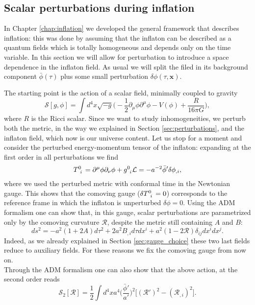 \subsection{Scalar perturbations during inflation}
In Chapter \ref{chap:inflation} we developed the general framework that describes inflation: this was done by assuming that the inflaton can be described as a quantum fields which is totally homogeneous and depends only on the time variable. In this section we will allow for perturbation to introduce a space dependence in the inflaton field. As usual we will split the filed in its background component $\bar\phi(\tau)$ plus some small perturbation $\delta\phi(\tau,\mathbf x)$.

The starting point is the action of a scalar field, minimally coupled to gravity
$$\mathcal{S} [g,\phi]=\int d^4x\sqrt{-g}\bigg(-\frac{1}{2}\partial_\mu\phi\partial^\mu\phi-V(\phi)+\frac{R}{16\pi G}\bigg),$$where $R$ is the Ricci scalar. Since we want to study inhomogeneities, we perturb both the metric, in the way we explained in Section \ref{sec:perturbations}, and the inflaton field, which now is our universe content. Let us stop for a moment and consider the perturbed energy-momentum tensor of the inflaton: expanding at the first order in all perturbations we find
\begin{align*}
    \tensor{T}{^0_i}=\partial^\mu\phi\partial_\nu\phi+\tensor{g}{^0_i}\mathcal{L}=-a^{-2}\bar\phi'\delta\phi_{,i},
\end{align*}
where we used the perturbed metric with conformal time in the Newtonian gauge. This shows that the comoving gauge ($\delta\tensor{T}{^0_i}=0$) corresponds to the reference frame in which the inflaton is unperturbed $\delta\phi=0$.
Using the ADM formalism one can show that, in this gauge, scalar perturbations are parametrized only by the comoving curvature $\mathcal{R}$, despite the metric still containing $A$ and $B$:
$$ds^2=-a^2(1+2A)d\tau^2+2a^2B_{,i}d\tau dx^i+a^2(1-2\mathcal{R})\delta_{ij}dx^idx^j.$$
Indeed, as we already explained in Section \ref{sec:gauge_choice} these two last fields reduce to auxiliary fields. For these reasons we fix the comoving gauge from now on.\\
Through the ADM formalism one can also show \cite{baumann2012tasilecturesinflation} that the above action, at the second order reads
\begin{equation}
    \mathcal{S}_{2}[\mathcal{R} ]=\frac{1}{2}\int d^4x a^4\bigg(\frac{\bar \phi'}{a'}\bigg)^2\Big[(\mathcal{R}')^2-(\mathcal{R}_{,i})^2\Big].
\end{equation}
